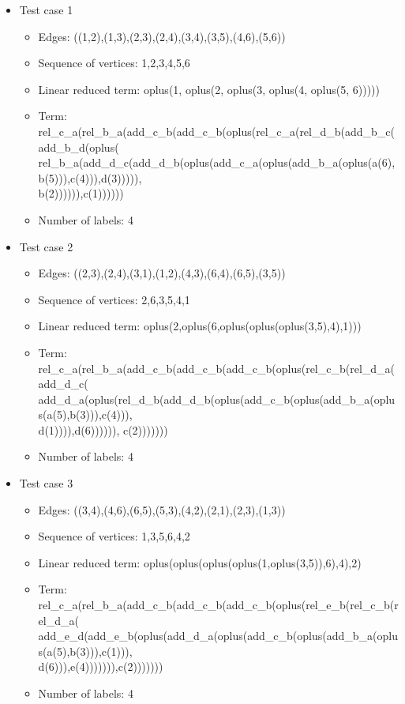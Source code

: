 \documentclass[a4paper, 12pt]{article}
\begin{document}
\begin{itemize}

\item Test case 1
	\begin{itemize}
		\item Edges: ((1,2),(1,3),(2,3),(2,4),(3,4),(3,5),(4,6),(5,6))
		\item Sequence of vertices: 1,2,3,4,5,6
		\item Linear reduced term: oplus(1, oplus(2, oplus(3, oplus(4, oplus(5, 6)))))
		\item Term: rel\_c\_a(rel\_b\_a(add\_c\_b(add\_c\_b(oplus(rel\_c\_a(rel\_d\_b(add\_b\_c(add\_b\_d(oplus( \\ rel\_b\_a(add\_d\_c(add\_d\_b(oplus(add\_c\_a(oplus(add\_b\_a(oplus(a(6),b(5))),c(4))),d(3))))), \\
b(2)))))),c(1))))))
		\item Number of labels: 4
	\end{itemize}

\item Test case 2
	\begin{itemize}
		\item Edges: ((2,3),(2,4),(3,1),(1,2),(4,3),(6,4),(6,5),(3,5))
		\item Sequence of vertices: 2,6,3,5,4,1
		\item Linear reduced term: oplus(2,oplus(6,oplus(oplus(oplus(3,5),4),1)))
		\item Term: rel\_c\_a(rel\_b\_a(add\_c\_b(add\_c\_b(add\_c\_b(oplus(rel\_c\_b(rel\_d\_a(add\_d\_c( \\
add\_d\_a(oplus(rel\_d\_b(add\_d\_b(oplus(add\_c\_b(oplus(add\_b\_a(oplus(a(5),b(3))),c(4))), \\
d(1)))),d(6)))))), c(2)))))))
		\item Number of labels: 4
	\end{itemize}

\item Test case 3
	\begin{itemize}
		\item Edges: ((3,4),(4,6),(6,5),(5,3),(4,2),(2,1),(2,3),(1,3))		
		\item Sequence of vertices: 1,3,5,6,4,2
		\item Linear reduced term: oplus(oplus(oplus(oplus(1,oplus(3,5)),6),4),2)
		\item Term: rel\_c\_a(rel\_b\_a(add\_c\_b(add\_c\_b(add\_c\_b(oplus(rel\_e\_b(rel\_c\_b(rel\_d\_a( \\
add\_e\_d(add\_e\_b(oplus(add\_d\_a(oplus(add\_c\_b(oplus(add\_b\_a(oplus(a(5),b(3))),c(1))), \\
d(6))),e(4))))))),c(2)))))))
		\item Number of labels: 4
	\end{itemize}


\end{itemize}
\end{document}
